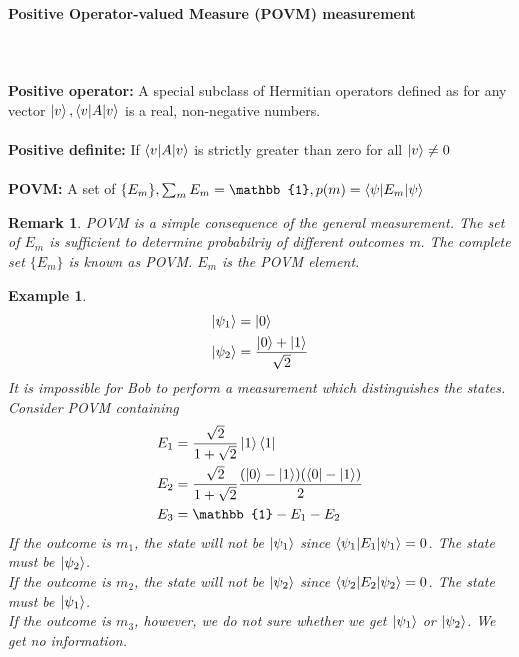 \documentclass[]{article}
\newtheorem*{remark}{Remark}
\newtheorem*{example}{Example}
\theoremstyle{nonumberplain}
\begin{document}
\paragraph{Positive Operator-valued Measure (POVM) measurement}%
\ \\
\\
\textbf{Positive operator:} A special subclass of Hermitian operators defined as for any vector $\ket{v}, \braket{v|A|v}$ is a real, non-negative numbers.\\
\\
\textbf{Positive definite:} If $\braket{v|A|v}$ is strictly greater than zero for all $\ket{v}\neq 0$\\
\\
\textbf{POVM:} A set of $\{E_{m}\}, \sum^{}_{m} E_{m}=\mathbb{1}, p(m)=\braket{\psi|E_{m}|\psi}$
\begin{remark}
	POVM is a simple consequence of the general measurement. The set of $E_{m}$ is sufficient to determine probabilriy of different outcomes m. The complete set $\{E_{m}\}$ is known as POVM. $E_{m}$ is the POVM element.
\end{remark}
\begin{example}
\begin{equation*}
\begin{aligned}
	\ket{{\psi_{1}}}&=\ket{0}\\
	\ket{\psi_{2}}&=\frac{\ket{0}+\ket{1}}{\sqrt{2}}
\end{aligned}
\end{equation*}
It is impossible for Bob to perform a measurement which distinguishes the states. \\
Consider POVM containing 
\begin{equation*}
\begin{aligned}
	E_{1}&=\frac{\sqrt{2}}{1+\sqrt{2}}\ket{1}\bra{1}\\
	E_{2}&=\frac{\sqrt{2}}{1+\sqrt{2}}\frac{(\ket{0}-\ket{1})(\bra{0}-\ket{1})}{2}\\
	E_{3}&=\mathbb{1}-E_{1}-E_{2}
\end{aligned}
\end{equation*}
If the outcome is $m_{1}$, the state will not be $\ket{\psi_{1}}$ since $\braket{\psi_{1}|E_{1}|\psi_{1}}=0$. The state must be $\ket{\psi_{2}}$.\\
If the outcome is $m_{2}$, the state will not be $\ket{\psi_{2}}$ since $\braket{\psi_{2}|E_{2}|\psi_{2}}=0$. The state must be $\ket{\psi_{1}}$.\\
If the outcome is $m_{3}$, however, we do not sure whether we get $\ket{\psi_{1}}$ or $\ket{\psi_{2}}$. We get no information.
\end{example}
\end{document}
